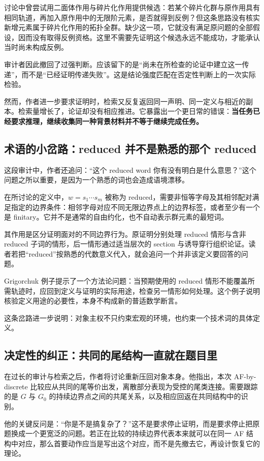 \documentclass[UTF8,zihao=-4,fontset=none,oneside,openany]{ctexbook}
\begin{document}
讨论中曾尝试用二面体作用与碎片化作用提供候选：若某个碎片化群与原作用具有相同轨道，再加入原作用中的无限阶元素，是否就得到反例？但这条思路没有核实新增元素属于碎片化作用的拓扑全群。缺少这一项，它就没有满足原问题的全部假设，因而没有取得反例资格。这里不需要先证明这个候选永远不能成功，才能承认当时尚未构成反例。

审计者因此撤回了过强判断。应该留下的是“尚未在所检查的论证中建立这一传递”，而不是“已经证明传递失败”。这是结论强度匹配在否定性判断上的一次实际检验。

然而，作者进一步要求证明时，检索又反复返回同一声明、同一定义与相近的副本。检索量增长了，论证却没有相应推进。它暴露出一个更日常的错误：\textbf{当任务已经要求推理，继续收集同一种背景材料并不等于继续完成任务。}

\subsection*{术语的小岔路：reduced 并不是熟悉的那个 reduced}
这段审计中，作者还追问：“这个 reduced word 你有没有明白是什么意思？”这个问题之所以重要，是因为一个熟悉的词也会造成语境漂移。

在所讨论的定义中，$w=s_1\cdots s_m$ 被称为 reduced，需要非恒等字母及其相邻配对满足指定的边界条件：相邻字母对应不同无限边界点上的边界标签，或者至少有一个是 finitary。它并不是通常的自由约化，也不自动表示群元素的最短词。\cite[Definition~4.2, Remark~4.5]{kua24}

其作用是区分证明面对的不同边界行为。原证明分别处理 reduced 情形与含非 reduced 子词的情形，后一情形通过适当层次的 section 与诱导穿行组织论证。读者若把“reduced”按熟悉的代数意义代入，就会追问一个并非该定义要回答的问题。

Grigorchuk 例子提示了一个方法论问题：当预期使用的 reduced 情形不能覆盖所需轨迹时，应回到定义与证明的实际用途，检查另一情形如何处理。这个例子说明核验定义用途的必要性，本身不构成新的普适数学断言。

这条岔路进一步说明：对象主权不只约束宏观的环境，也约束一个技术词的具体定义。

\subsection*{决定性的纠正：共同的尾结构一直就在题目里}
在过长的审计与检索之后，作者将讨论重新压回对象本身。他指出，本次 AF-by-discrete 比较应从共同的尾等价出发，离散部分表现为受控的尾类连接。需要跟踪的是 $G$ 与 $G_0$ 的持续边界点之间的共尾关系，以及相应回返在共同结构中的识别。

他的关键反问是：“你是不是搞复杂了？”这不是要求停止证明，而是要求停止把原题换成一个更宽泛的问题。若正在比较的持续边界代表本来就可以在同一 AF 结构中对应，那么首要动作应当是写出这个对应，而不是先撤去它，再设计恢复它的理论。
\end{document}
